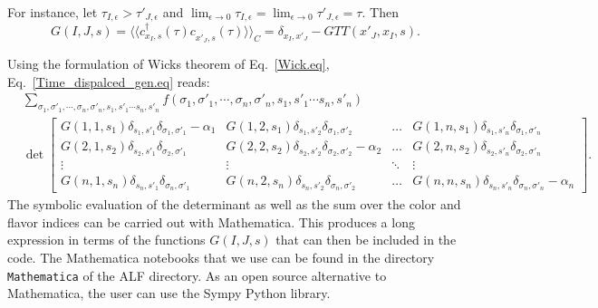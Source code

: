 For instance, let  $\tau_{I,\epsilon}   > \tau'_{J,\epsilon}  $  and $ \lim_{\epsilon \rightarrow 0 } \tau_{I,\epsilon}   = \lim_{\epsilon \rightarrow 0 }\tau'_{J,\epsilon} = \tau$. Then 
\begin{equation}
	G(I,J,s)   =  \langle \langle  c^{\dagger}_{x_I,s}(\tau) c^{\phantom\dagger}_{x'_{J},s}(\tau)  \rangle \rangle_{C}  =   \delta_{x_I,x'_J} -  GTT(x'_J,x_I,s).
\end{equation}

Using the formulation of Wicks theorem of Eq.~\ref{Wick.eq},  Eq.~\ref{Time_dispalced_gen.eq}  reads: 
\begin{align}
	& \sum_{\sigma_1, \sigma'_1, \cdots, \sigma_n, \sigma'_n,  s_1, s'_1  \cdots s_n,  s'_n  }  f( \sigma_1, \sigma'_1, \cdots, \sigma_n, \sigma'_n,  s_1, s'_1  \cdots s_n,  s'_n ) 
	\\
	& \det  
\begin{bmatrix}
   G(1,1,s_1) \delta_{s_1,s'_1} \delta_{\sigma_1,\sigma'_1} - \alpha_1 & 
   G(1,2,s_1) \delta_{s_1,s'_2} \delta_{\sigma_1,\sigma'_2}   \phantom{ - \alpha_1}         & \dots   &   
   G(1,n,s_1) \delta_{s_1,s'_n} \delta_{\sigma_1,\sigma'_n}   \phantom{ - \alpha_1} \\
   G(2,1,s_2) \delta_{s_2,s'_1} \delta_{\sigma_2,\sigma'_1}  \phantom{ - \alpha_1} &   
   G(2,2,s_2) \delta_{s_2,s'_2} \delta_{\sigma_2,\sigma'_2} - \alpha_2  & \dots  &
    G(2,n,s_2) \delta_{s_2,s'_n} \delta_{\sigma_2,\sigma'_n} \phantom{ - \alpha_2}  \\
    \vdots & \vdots &  \ddots & \vdots \\
    G(n,1,s_n) \delta_{s_n,s'_1} \delta_{\sigma_n,\sigma'_1}   \phantom{- \alpha_n} & 
    G(n,2,s_n) \delta_{s_n,s'_2} \delta_{\sigma_n,\sigma'_2}   \phantom{- \alpha_n} & \dots  & 
     G(n,n,s_n) \delta_{s_n,s'_n} \delta_{\sigma_n,\sigma'_n}   - \alpha_n  
 \end{bmatrix}.   \nonumber 
\end{align}
The  symbolic evaluation of the  determinant   as well as the sum over the color and flavor indices can be carried out with Mathematica.  This  produces a  long expression in terms of the   functions $G(I,J,s)$ that can then be  included in the code.   The Mathematica notebooks  that we use  can be found in the directory  \texttt{Mathematica}  of  the ALF  directory.   As an open source alternative to Mathematica, the user can use the  Sympy  Python library. 
